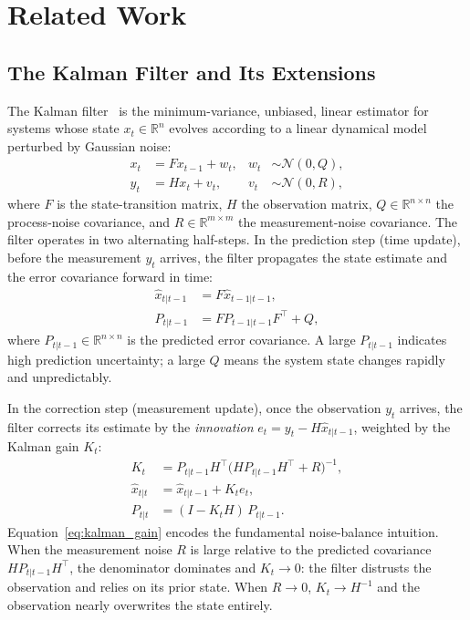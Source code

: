 \chapter{Related Work}
\label{ch:irodalom}

\section{The Kalman Filter and Its Extensions}
\label{sec:kalman}

The Kalman filter~\cite{kalman1960new} is the minimum-variance, unbiased, linear
estimator for systems whose state $x_t \in \mathbb{R}^n$ evolves according to
a linear dynamical model perturbed by Gaussian noise:
\begin{align}
    x_t &= F x_{t-1} + w_t, & w_t &\sim \mathcal{N}(0, Q), \label{eq:kf_process}\\
    y_t &= H x_t   + v_t,   & v_t &\sim \mathcal{N}(0, R), \label{eq:kf_measure}
\end{align}
where $F$ is the state-transition matrix, $H$ the observation matrix,
$Q \in \mathbb{R}^{n \times n}$ the process-noise covariance, and
$R \in \mathbb{R}^{m \times m}$ the measurement-noise covariance. The filter
operates in two alternating half-steps.
In the prediction step (time update), before the measurement $y_t$ arrives,
the filter propagates the state estimate and the error covariance forward
in time:
\begin{align}
    \hat{x}_{t|t-1} &= F \hat{x}_{t-1|t-1}, \label{eq:kf_predict_x}\\
    P_{t|t-1}       &= F P_{t-1|t-1} F^\top + Q, \label{eq:kf_predict_P}
\end{align}
where $P_{t|t-1} \in \mathbb{R}^{n \times n}$ is the predicted error
covariance. A large $P_{t|t-1}$ indicates high prediction uncertainty;
a large $Q$ means the system state changes rapidly and unpredictably.

In the correction step (measurement update), once the observation $y_t$
arrives, the filter corrects its estimate by the
\emph{innovation} $e_t = y_t - H\hat{x}_{t|t-1}$, weighted by the Kalman
gain $K_t$:
\begin{align}
    K_t           &= P_{t|t-1} H^\top \bigl(H P_{t|t-1} H^\top + R\bigr)^{-1},
                     \label{eq:kalman_gain}\\
    \hat{x}_{t|t} &= \hat{x}_{t|t-1} + K_t e_t, \label{eq:kalman_update}\\
    P_{t|t}       &= (I - K_t H)\,P_{t|t-1}. \label{eq:kf_update_P}
\end{align}
Equation~\eqref{eq:kalman_gain} encodes the fundamental noise-balance
intuition. When the measurement noise $R$ is large relative to the predicted
covariance $H P_{t|t-1} H^\top$, the denominator dominates and $K_t \to 0$:
the filter distrusts the observation and relies on its prior state. When $R
\to 0$, $K_t \to H^{-1}$ and the observation nearly overwrites the state
entirely.

